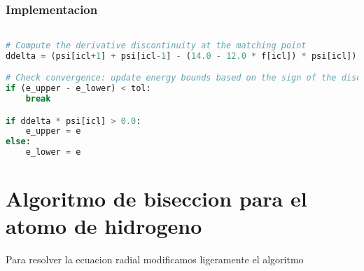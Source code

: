 \documentclass[11pt]{article}
\begin{document}
\subsubsection{Implementacion}
\label{sec:org92fc76f}

\begin{lstlisting}[language=Python,numbers=none]

# Compute the derivative discontinuity at the matching point
ddelta = (psi[icl+1] + psi[icl-1] - (14.0 - 12.0 * f[icl]) * psi[icl]) / dx

# Check convergence: update energy bounds based on the sign of the discontinuity.
if (e_upper - e_lower) < tol:
    break

if ddelta * psi[icl] > 0.0:
    e_upper = e
else:
    e_lower = e

\end{lstlisting}
\section{Algoritmo de biseccion para el atomo de hidrogeno}
\label{sec:org4a1872f}

Para resolver la ecuacion radial modificamos ligeramente el algoritmo
\end{document}
